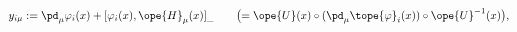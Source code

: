\begin{equation}
			\label{8.9}
y_{i\mu}
:=
\pd_\mu\varphi_i(x) + [\varphi_i(x), \ope{H}_\mu(x)]_{\_}
\qquad
\bigl(
= \ope{U}(x)\circ (\pd_\mu\tope{\varphi}_i(x))\circ \ope{U}^{-1}(x)
\bigr) ,
	\end{equation}

